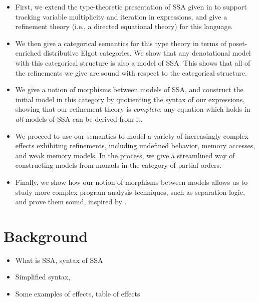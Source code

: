 \documentclass[acmsmall,screen,review]{acmart}
\begin{document}
\begin{itemize}
  \item First, we extend the type-theoretic presentation of SSA given in
  \citet{ghalayini-24-ssa-densem-arxiv} to support tracking variable multiplicity and iteration
  in expressions, and give a refinement theory (i.e., a directed equational theory) for this language. 
  \item We then give a categorical semantics for this type theory in terms of poset-enriched
  distributive Elgot categories. We show that any denotational model with this categorical structure
  is also a model of SSA. This shows that all of the refinements we give are sound with respect to
  the categorical structure.
  \item We give a notion of morphisms between models of SSA, and construct the initial model in this
  category by quotienting the syntax of our expressions, showing that our refinement theory is
  \emph{complete}: any equation which holds in \emph{all} models of SSA can be derived from it.
  \item We proceed to use our semantics to model a variety of increasingly complex effects
  exhibiting refinements, including undefined behavior, memory accesses, and weak memory models. In
  the process, we give a streamlined way of constructing models from monads in the category of
  partial orders.
  \item Finally, we show how our notion of morphisms between models allows us to study more complex
  program analysis techniques, such as separation logic, and prove them sound, inspired by
  \citet{mellies-ftrs}.
\end{itemize}

\section{Background}

\begin{itemize}
  \item What is SSA, syntax of SSA
  \item Simplified syntax, \citet{ghalayini-24-ssa-densem-arxiv}
  \item Some examples of effects, table of effects
\end{itemize}
\end{document}
